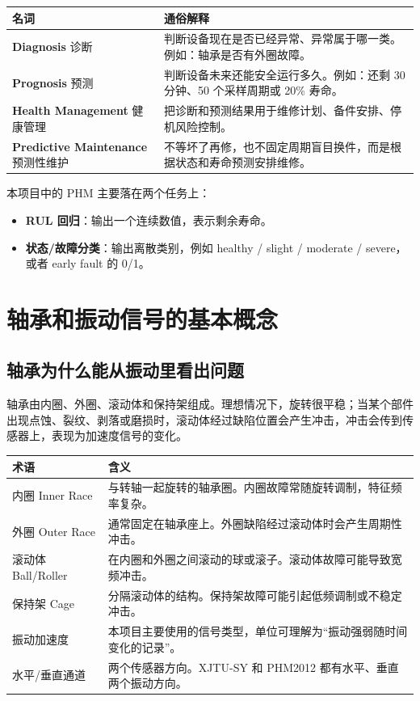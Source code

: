 \documentclass[UTF8,11pt]{ctexart}
\newcommand{\term}[1]{\textbf{\color{phmblue}#1}}
\begin{document}
\begin{longtable}{L{3.2cm}L{11.2cm}}
\toprule
名词 & 通俗解释 \\
\midrule
\endhead
\term{Diagnosis} 诊断 & 判断设备现在是否已经异常、异常属于哪一类。例如：轴承是否有外圈故障。 \\
\term{Prognosis} 预测 & 判断设备未来还能安全运行多久。例如：还剩 30 分钟、50 个采样周期或 20\% 寿命。 \\
\term{Health Management} 健康管理 & 把诊断和预测结果用于维修计划、备件安排、停机风险控制。 \\
\term{Predictive Maintenance} 预测性维护 & 不等坏了再修，也不固定周期盲目换件，而是根据状态和寿命预测安排维修。 \\
\bottomrule
\end{longtable}

本项目中的 PHM 主要落在两个任务上：
\begin{itemize}
  \item \term{RUL 回归}：输出一个连续数值，表示剩余寿命。
  \item \term{状态/故障分类}：输出离散类别，例如 healthy / slight / moderate / severe，或者 early fault 的 0/1。
\end{itemize}

\section{轴承和振动信号的基本概念}

\subsection{轴承为什么能从振动里看出问题}

轴承由内圈、外圈、滚动体和保持架组成。理想情况下，旋转很平稳；当某个部件出现点蚀、裂纹、剥落或磨损时，滚动体经过缺陷位置会产生冲击，冲击会传到传感器上，表现为加速度信号的变化。

\begin{longtable}{L{3.5cm}L{10.8cm}}
\toprule
术语 & 含义 \\
\midrule
\endhead
内圈 Inner Race & 与转轴一起旋转的轴承圈。内圈故障常随旋转调制，特征频率复杂。 \\
外圈 Outer Race & 通常固定在轴承座上。外圈缺陷经过滚动体时会产生周期性冲击。 \\
滚动体 Ball/Roller & 在内圈和外圈之间滚动的球或滚子。滚动体故障可能导致宽频冲击。 \\
保持架 Cage & 分隔滚动体的结构。保持架故障可能引起低频调制或不稳定冲击。 \\
振动加速度 & 本项目主要使用的信号类型，单位可理解为“振动强弱随时间变化的记录”。 \\
水平/垂直通道 & 两个传感器方向。XJTU-SY 和 PHM2012 都有水平、垂直两个振动方向。 \\
\bottomrule
\end{longtable}
\end{document}
